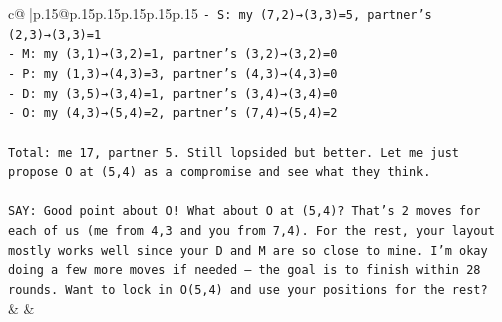 \documentclass{article}
\begin{document}
{\begin{supertabular}{c@{$\;$}|p{.15\linewidth}@{}p{.15\linewidth}p{.15\linewidth}p{.15\linewidth}p{.15\linewidth}p{.15\linewidth}}
{{{\texttt{{-} S: my (7,2)→(3,3)=5, partner's (2,3)→(3,3)=1} \\
\texttt{{-} M: my (3,1)→(3,2)=1, partner's (3,2)→(3,2)=0} \\
\texttt{{-} P: my (1,3)→(4,3)=3, partner's (4,3)→(4,3)=0} \\
\texttt{{-} D: my (3,5)→(3,4)=1, partner's (3,4)→(3,4)=0} \\
\texttt{{-} O: my (4,3)→(5,4)=2, partner's (7,4)→(5,4)=2} \\
\\ 
\texttt{Total: me 17, partner 5. Still lopsided but better. Let me just propose O at (5,4) as a compromise and see what they think.} \\
\\ 
\texttt{SAY: Good point about O! What about O at (5,4)? That's 2 moves for each of us (me from 4,3 and you from 7,4). For the rest, your layout mostly works well since your D and M are so close to mine. I'm okay doing a few more moves if needed — the goal is to finish within 28 rounds. Want to lock in O(5,4) and use your positions for the rest?} \\
            }
        }
    }
    & & \\ \\


\end{supertabular}}
\end{document}
